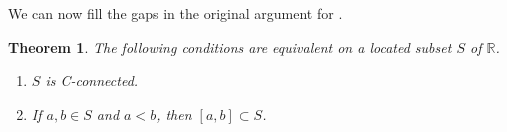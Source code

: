 \documentclass[11pt]{article}%
\newtheorem{theorem}{Theorem}
\begin{document}
%

\medskip


We can now fill the gaps in the original argument for \cite[Thm 1]{dsb}.

\begin{theorem}
\label{jun03t1}The following conditions are equivalent on a located subset $S
$ of $\mathbb{R}$.

\begin{enumerate}
\item[\emph{(i)}] $S$ is C-connected.

\item[\emph{(ii)}] If $a,b\in S$ and $a<b$, then $\left[  a,b\right]  \subset
S $.
\end{enumerate}
\end{theorem}
\end{document}
